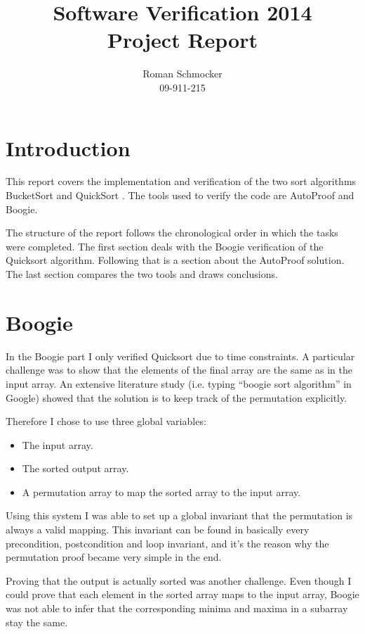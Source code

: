 \documentclass[a4paper,10pt]{article}
\title{Software Verification 2014 \\ Project Report}
\author{Roman Schmocker \\ 09-911-215}
\newcommand{\todoref}{\todo{ref}}
\begin{document}
\maketitle


\section{Introduction}
This report covers the implementation and verification of the two sort algorithms BucketSort \todoref and QuickSort \todoref.
The tools used to verify the code are AutoProof \todoref and Boogie\todoref.

The structure of the report follows the chronological order in which the tasks were completed.
The first section deals with the Boogie verification of the Quicksort algorithm.
Following that is a section about the AutoProof solution.
The last section compares the two tools and draws conclusions.

\section {Boogie}

In the Boogie part I only verified Quicksort due to time constraints.
A particular challenge was to show that the elements of the final array are the same as in the input array.
An extensive literature study (i.e. typing ``boogie sort algorithm'' in Google) showed that the solution is to 
keep track of the permutation explicitly.

Therefore I chose to use three global variables:
\begin{itemize}
 \item The input array.
 \item The sorted output array.
 \item A permutation array to map the sorted array to the input array.
\end{itemize}

Using this system I was able to set up a global invariant that the permutation is always a valid mapping.
This invariant can be found in basically every precondition, postcondition and loop invariant, and it's the reason why the permutation proof became very simple in the end.

Proving that the output is actually sorted was another challenge.
Even though I could prove that each element in the sorted array maps to the input array,
Boogie was not able to infer that the corresponding minima and maxima in a subarray stay the same.
\end{document}
